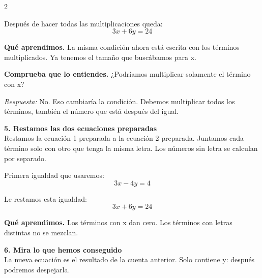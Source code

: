\documentclass[11pt,a4paper,landscape]{article}
\begin{document}
\begin{multicols*}{2}
\begin{minipage}{\linewidth}
\par\smallskip Después de hacer todas las multiplicaciones queda:
\[3x + 6y = 24\]
\par\smallskip\textbf{Qué aprendimos.} La misma condición ahora está escrita con los términos multiplicados. Ya tenemos el tamaño que buscábamos para x.
\par\smallskip\textbf{Comprueba que lo entiendes.} ¿Podríamos multiplicar solamente el término con x?\par\textit{Respuesta:} No. Eso cambiaría la condición. Debemos multiplicar todos los términos, también el número que está después del igual.
\end{minipage}\par\medskip
\noindent\begin{minipage}{\linewidth}\textbf{5. Restamos las dos ecuaciones preparadas}\\[2pt]Restamos la ecuación 1 preparada a la ecuación 2 preparada. Juntamos cada término solo con otro que tenga la misma letra. Los números sin letra se calculan por separado.
\par{}\par\smallskip
\par\smallskip Primera igualdad que usaremos:
\[3x - 4y = 4\]
\par\smallskip Le restamos esta igualdad:
\[3x + 6y = 24\]
\par\smallskip\textbf{Qué aprendimos.} Los términos con x dan cero. Los términos con letras distintas no se mezclan.
\end{minipage}\par\medskip
\noindent\begin{minipage}{\linewidth}\textbf{6. Mira lo que hemos conseguido}\\[2pt]La nueva ecuación es el resultado de la cuenta anterior. Solo contiene y: después podremos despejarla.

\end{minipage}
\end{multicols*}
\end{document}
